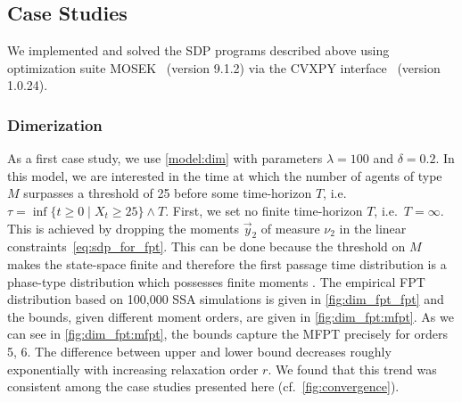 \subsection{Case Studies}
We implemented and solved the \ac{SDP} programs described above using optimization suite MOSEK~\cite{mosek} (version 9.1.2) via the CVXPY
interface~\cite{cvxpy} (version 1.0.24).

\subsubsection{Dimerization}
As a first case study, we use \autoref{model:dim} with parameters $\lambda=100$ and $\delta=0.2$.
In this model, we are interested in the time at which the number of agents of type $M$
surpasses a threshold of 25 before some time-horizon $T$,
i.e.\ $\tau=\inf\{t\geq 0\mid X_t \geq 25\}\land T$.
First, we set no finite time-horizon $T$, i.e.\ $T=\infty$.
This is achieved by dropping the moments $\vec y_2$
of measure $\nu_2$ in the linear constraints~\eqref{eq:sdp_for_fpt}.
This can be done because the threshold on $M$ makes the state-space finite
and therefore the first passage time distribution is a phase-type distribution
which possesses finite moments \cite[Chapter 7.6]{stewart2009probability}.
The empirical \ac{FPT} distribution based on 100,000 \ac{SSA} simulations is given in \autoref{fig:dim_fpt_fpt}
and the bounds, given different moment orders, are given in \autoref{fig:dim_fpt:mfpt}.
As we can see in \autoref{fig:dim_fpt:mfpt}, the bounds capture the \ac{MFPT} precisely for orders 5, 6.
The difference between upper and lower bound decreases roughly exponentially with increasing relaxation order $r$.
We found that this trend was consistent among the case studies presented here (cf.\ \autoref{fig:convergence}).
